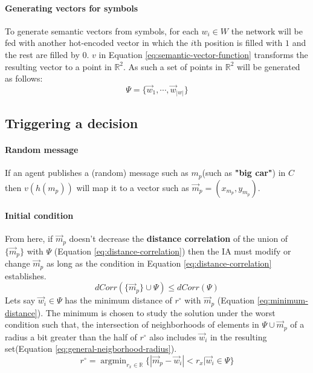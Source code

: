 \documentclass{article}
\DeclareMathOperator*{\argmin}{argmin}
\begin{document}
\begin{multicols}{2}
			\paragraph{Generating vectors for symbols} To generate semantic vectors from symbols, for each $w_i \in W$ the network will be fed with another hot-encoded vector in which the $i$th position is filled with $1$ and the rest are filled by $0$. $v$ in Equation \ref{eq:semantic-vector-function} transforms the resulting vector to a point in $\mathbb{R}^2$. As such a set of points in $\mathbb{R}^2$ will be generated as follows:
			\begin{equation}
				\Psi = \{\vec{w}_1,\dotsb,\vec{w}_{|w|}\}
				\label{eq:semantic-word-vectors}
			\end{equation}
			
			\subsection{Triggering a decision}\label{sec:sample-solution-triggering-a-decision} 
			
			\paragraph{Random message} If an agent publishes a (random) message such as $m_p$(such as \textbf{"big car"})  in $C$ then $v(h(m_p))$ will map it to a vector such as $\vec{m}_p=(x_{m_p},y_{m_p})$. 
			
			\paragraph{Initial condition} From here, if $\vec{m}_p$ doesn't decrease the \textbf{distance correlation} of the union of $\{\vec{m}_p\}$ with $\Psi$ (Equation \ref{eq:distance-correlation}) then the IA must modify or change $\vec{m}_p$ as long as the condition in Equation \ref{eq:distance-correlation} establishes. 
			\begin{equation}
				dCorr(\{\vec{m}_p\} \cup \Psi) \leq dCorr(\Psi)
				\label{eq:distance-correlation}
			\end{equation}
			Lets say $\vec{w}_i \in \Psi$ has the minimum distance of $r^{\circ}$ with $\vec{m}_p$ (Equation \ref{eq:minimum-distance}). The minimum is chosen to study the solution under the worst condition such that, the intersection of neighborhoods of elements in $\Psi \cup \vec{m}_p$ of a radius a bit greater than the half of $r^{\circ}$  also includes $\vec{w}_i$ in the resulting set(Equation \ref{eq:general-neigborhood-radius}). 
			\begin{equation}
				r^{\circ} = \argmin_{r_x\in\mathbb{R}} \{|\vec{m}_p-\vec{w}_i|<r_x|\vec{w}_i\in\Psi\}
				\label{eq:minimum-distance}
			\end{equation}
			

\end{multicols}
\end{document}
